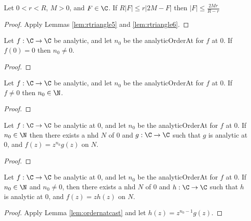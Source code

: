 \begin{lemma} \label{lem:rtriangle7}  \leanok
Let $0<r<R$, $M>0$, and $F\in\C$. If $R|F| \le r|2M-F|$ then $|F| \le \frac{2Mr}{R-r}$
\end{lemma}
\begin{proof} \leanok {}
Apply Lemmas \ref{lem:rtriangle5} and \ref{lem:rtriangle6}.
\end{proof}


\begin{lemma} \label{lem:orderne0} 
\leanok
Let $f:\C\to\C$ be analytic, and let $n_0$ be the analyticOrderAt for $f$ at $0$.
If $f(0)=0$ then $n_0 \neq 0$.
\end{lemma}
\begin{proof}
\leanok
\end{proof}

\begin{lemma} \label{lem:ordernetop} 
\leanok
Let $f:\C\to\C$ be analytic, and let $n_0$ be the analyticOrderAt for $f$ at $0$.
If $f\neq 0$ then $n_0 \in \N$.
\end{lemma}
\begin{proof}
\leanok
\end{proof}


\begin{lemma} \label{lem:ordernatcast} 
\leanok
Let $f:\C\to\C$ be analytic at $0$, and let $n_0$ be the analyticOrderAt for $f$ at $0$. If $n_0\in\N$ then there exists a nhd $N$ of $0$ and $g:\C\to\C$ such that $g$ is analytic at $0$, and $f(z) = z^{n_0} g(z)$ on $N$.
\end{lemma}
\begin{proof}
\leanok
\end{proof}



\begin{lemma} \label{lem:ordernatcast1} 
\leanok
Let $f:\C\to\C$ be analytic at $0$, and let $n_0$ be the analyticOrderAt for $f$ at $0$. If $n_0\in\N$ and $n_0\neq 0$, then there exists a nhd $N$ of $0$ and $h:\C\to\C$ such that $h$ is analytic at $0$, and $f(z) = zh(z)$ on $N$.
\end{lemma}
\begin{proof}
\leanok
{}
Apply Lemma \ref{lem:ordernatcast} and let $h(z)=z^{n_0-1} g(z)$.
\end{proof}



